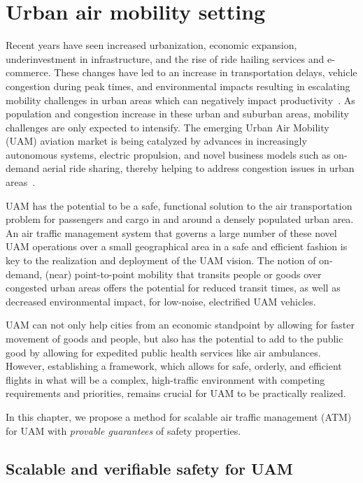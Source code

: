 
\section{Urban air mobility setting}
Recent years have seen increased urbanization, economic expansion, underinvestment in infrastructure, and the rise of ride hailing services and e-commerce.  These changes have led to an increase in transportation delays, vehicle congestion during peak times, and environmental impacts resulting in escalating mobility challenges in urban areas which can negatively impact productivity~\cite{harriet2013assessment}. As population and congestion increase in these urban and suburban areas, mobility challenges are only expected to intensify. The emerging Urban Air Mobility (UAM) aviation market is being catalyzed by advances in increasingly autonomous systems, electric propulsion, and novel business models such as on-demand aerial ride sharing, thereby helping to address congestion issues in urban areas~\cite{flightplan2030}.  

UAM has the potential to be a safe, functional solution to the air transportation problem for passengers and cargo in and around a densely populated urban area.  An air traffic management system that governs a large number of these novel UAM operations over a small geographical area in a safe and efficient fashion is key to the realization and deployment of the UAM vision.  The notion of on-demand, (near) point-to-point mobility that transits people or goods over congested urban areas offers the potential for reduced transit times, as well as decreased environmental impact, for low-noise, electrified UAM vehicles.  

UAM can not only help cities from an economic standpoint by allowing for faster movement of goods and people, but also has the potential to add to the public good by allowing for expedited public health services like air ambulances. However, establishing a framework, which allows for safe, orderly, and efficient flights in what will be a complex, high-traffic environment with competing requirements and priorities, remains crucial for UAM to be practically realized. 

In this chapter, we propose a method for scalable air traffic management (ATM) for UAM with \emph{provable guarantees} of safety properties. 


\subsection{Scalable and verifiable safety for UAM}

